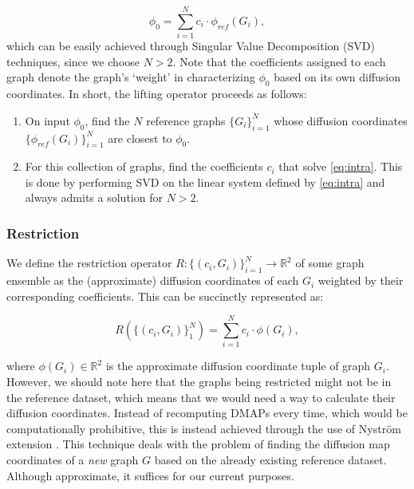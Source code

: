 \begin{equation}
  \label{eq:intra}
  \phi_0 = \sum_{i = 1}^N c_i \cdot \phi_{ref}(G_i),
\end{equation}
which can be easily achieved through Singular Value Decomposition
(SVD) techniques, since we choose $N > 2$. Note that the coefficients
assigned to each graph denote the graph's `weight' in characterizing
$\phi_0$ based on its own diffusion coordinates. In short, the lifting
operator proceeds as follows:
\begin{enumerate}
\item On input $\phi_0$, find the $N$ reference graphs
  $\{G_i\}^N_{i = 1}$ whose diffusion coordinates
  $\{\phi_{ref}(G_i)\}_{i = 1}^N$ are closest to $\phi_0$.

\item For this collection of graphs, find the coefficients $c_i$ that
  solve \ref{eq:intra}. This is done by performing SVD on the linear
  system defined by \ref{eq:intra} and always admits a solution for
  $N > 2$.
\end{enumerate}

\subsubsection{Restriction}

We define the restriction operator
$R: \{(c_i,G_i)\}^N_{i = 1} \rightarrow \mathbb{R}^2$ of some graph
ensemble as the (approximate) diffusion coordinates of each $G_i$
weighted by their corresponding coefficients. This can be succinctly
represented as:

\begin{equation}
  R(\{(c_i,G_i)\}_1^N) = \sum_{i = 1}^N c_i \cdot \phi(G_i),
\end{equation}

\noindent where $\phi(G_i) \in \mathbb{R}^2$ is the approximate
diffusion coordinate tuple of graph $G_i$. However, we should note
here that the graphs being restricted might not be in the reference
dataset, which means that we would need a way to calculate their
diffusion coordinates. Instead of recomputing DMAPs every time, which
would be computationally prohibitive, this is instead achieved through
the use of Nystr\"om extension \cite{fowlkes_spectral_2004}. This
technique deals with the problem of finding the diffusion map
coordinates of a {\em new} graph $G$ based on the already existing
reference dataset. Although approximate, it suffices for our current
purposes.

